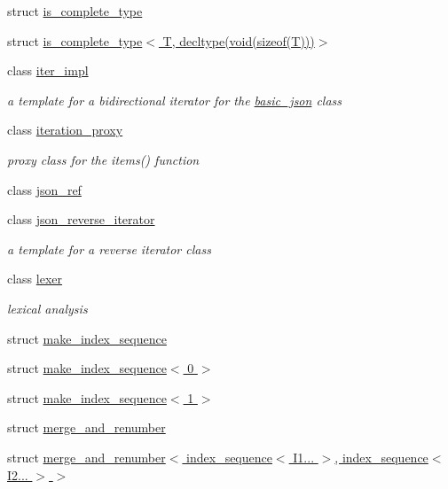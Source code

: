 \begin{DoxyCompactItemize}
\item 
struct \hyperlink{structnlohmann_1_1detail_1_1is__complete__type}{is\+\_\+complete\+\_\+type}
\item 
struct \hyperlink{structnlohmann_1_1detail_1_1is__complete__type_3_01_t_00_01decltype_07void_07sizeof_07_t_08_08_08_4}{is\+\_\+complete\+\_\+type$<$ T, decltype(void(sizeof(\+T)))$>$}
\item 
class \hyperlink{classnlohmann_1_1detail_1_1iter__impl}{iter\+\_\+impl}
\begin{DoxyCompactList}\small\item\em a template for a bidirectional iterator for the \hyperlink{classnlohmann_1_1basic__json}{basic\+\_\+json} class \end{DoxyCompactList}\item 
class \hyperlink{classnlohmann_1_1detail_1_1iteration__proxy}{iteration\+\_\+proxy}
\begin{DoxyCompactList}\small\item\em proxy class for the items() function \end{DoxyCompactList}\item 
class \hyperlink{classnlohmann_1_1detail_1_1json__ref}{json\+\_\+ref}
\item 
class \hyperlink{classnlohmann_1_1detail_1_1json__reverse__iterator}{json\+\_\+reverse\+\_\+iterator}
\begin{DoxyCompactList}\small\item\em a template for a reverse iterator class \end{DoxyCompactList}\item 
class \hyperlink{classnlohmann_1_1detail_1_1lexer}{lexer}
\begin{DoxyCompactList}\small\item\em lexical analysis \end{DoxyCompactList}\item 
struct \hyperlink{structnlohmann_1_1detail_1_1make__index__sequence}{make\+\_\+index\+\_\+sequence}
\item 
struct \hyperlink{structnlohmann_1_1detail_1_1make__index__sequence_3_010_01_4}{make\+\_\+index\+\_\+sequence$<$ 0 $>$}
\item 
struct \hyperlink{structnlohmann_1_1detail_1_1make__index__sequence_3_011_01_4}{make\+\_\+index\+\_\+sequence$<$ 1 $>$}
\item 
struct \hyperlink{structnlohmann_1_1detail_1_1merge__and__renumber}{merge\+\_\+and\+\_\+renumber}
\item 
struct \hyperlink{structnlohmann_1_1detail_1_1merge__and__renumber_3_01index__sequence_3_01_i1_8_8_8_01_4_00_01indf5ec8c9c7b5107e4b381e3ca4c1be2ca}{merge\+\_\+and\+\_\+renumber$<$ index\+\_\+sequence$<$ I1... $>$, index\+\_\+sequence$<$ I2... $>$ $>$}

\end{DoxyCompactItemize}
